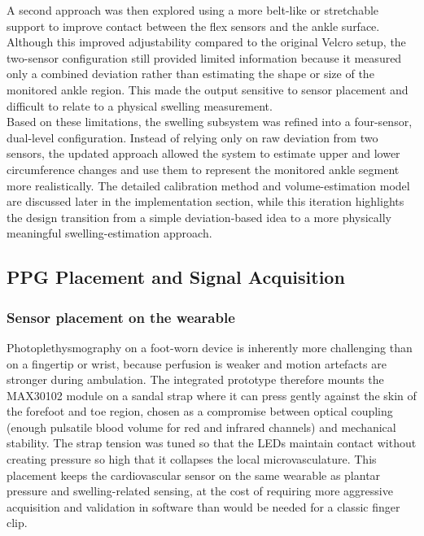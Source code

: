 \noindent A second approach was then explored using a more belt-like or stretchable support to improve contact between the flex sensors and the ankle surface. Although this improved adjustability compared to the original Velcro setup, the two-sensor configuration still provided limited information because it measured only a combined deviation rather than estimating the shape or size of the monitored ankle region. This made the output sensitive to sensor placement and difficult to relate to a physical swelling measurement. \\

\noindent Based on these limitations, the swelling subsystem was refined into a four-sensor, dual-level configuration. Instead of relying only on raw deviation from two sensors, the updated approach allowed the system to estimate upper and lower circumference changes and use them to represent the monitored ankle segment more realistically. The detailed calibration method and volume-estimation model are discussed later in the implementation section, while this iteration highlights the design transition from a simple deviation-based idea to a more physically meaningful swelling-estimation approach. \\








\subsection{PPG Placement and Signal Acquisition}
\label{subsec:iteration_ppg_signal}

\subsubsection{Sensor placement on the wearable}

\noindent Photoplethysmography on a foot-worn device is inherently more challenging than on a fingertip
or wrist, because perfusion is weaker and motion artefacts are stronger during ambulation. The
integrated prototype therefore mounts the MAX30102 module on a sandal strap where it can press
gently against the skin of the forefoot and toe region, chosen as a compromise between optical
coupling (enough pulsatile blood volume for red and infrared channels) and mechanical stability.
The strap tension was tuned so that the LEDs maintain contact without creating pressure so high
that it collapses the local microvasculature. This placement keeps the cardiovascular sensor on the
same wearable as plantar pressure and swelling-related sensing, at the cost of requiring more
aggressive acquisition and validation in software than would be needed for a classic finger clip. \\

